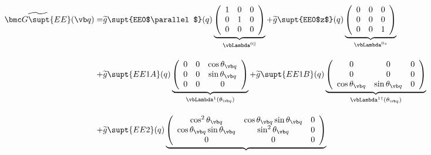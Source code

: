 \documentclass[letterpaper]{article}
\renewcommand{\wt}{\widetilde}
\begin{document}
\begin{align*}
 \wt{\bmc G\supt{EE}}(\vb q)
 = &\wt{g}\supt{EE0$\parallel$}(q)
    \underbrace{ \left(\begin{array}{ccc}
                       1 & 0 & 0 \\ 
                       0 & 1 & 0 \\ 
                       0 & 0 & 0 \\ 
                 \end{array}\right)
               }_{\vbLambda^{0\parallel}}
  + \wt{g}\supt{EE0$z$}(q)
    \underbrace{ \left(\begin{array}{ccc}
                       0 & 0 & 0 \\ 
                       0 & 0 & 0 \\ 
                       0 & 0 & 1 \\ 
                 \end{array}\right)
               }_{\vbLambda^{0z}}
\\[10pt]
 + &\wt{g}\supt{EE1A}(q)
    \underbrace{ \left(\begin{array}{ccc}
                       0 & 0 & \cos\theta_{\vb q} \\ 
                       0 & 0 & \sin\theta_{\vb q} \\ 
                       0 & 0 & 0 \\ 
                 \end{array}\right)
               }_{\vbLambda^{1}(\theta_{\vb q})}
 +  \wt{g}\supt{EE1B}(q)
    \underbrace{ \left(\begin{array}{ccc}
                       0 & 0 & 0 \\
                       0 & 0 & 0 \\
                       \cos\theta_{\vb q} & \sin\theta_{\vb q} & 0
                 \end{array}\right)
               }_{\vbLambda^{1\dagger}(\theta_{\vb q})}
\\[10pt]
  +&\wt{g}\supt{EE2}(q)
    \underbrace{
   \left(\begin{array}{ccc}
    \cos^2\theta_{\vb q}  & \cos\theta_{\vb q} \sin\theta_{\vb q} & 0 \\
    \cos\theta_{\vb q} \sin\theta_{\vb q} & \sin^2\theta_{\vb q}  & 0 \\
    0                     & 0                    & 0 
   \end{array}\right)
}
\end{align*}
\end{document}
